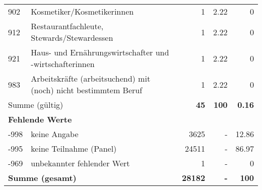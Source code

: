 \begin{longtable}{lXrrr}
        902 & \multicolumn{1}{X}{Kosmetiker/Kosmetikerinnen} & %
          \num{1} &
          \num[round-mode=places,round-precision=2]{2,22} &
          \num[round-mode=places,round-precision=2]{0} \\

        912 & \multicolumn{1}{X}{Restaurantfachleute, Stewards/Stewardessen} & %
          \num{1} &
          \num[round-mode=places,round-precision=2]{2,22} &
          \num[round-mode=places,round-precision=2]{0} \\

        921 & \multicolumn{1}{X}{Haus- und Ernährungswirtschafter und -wirtschafterinnen} & %
          \num{1} &
          \num[round-mode=places,round-precision=2]{2,22} &
          \num[round-mode=places,round-precision=2]{0} \\

        983 & \multicolumn{1}{X}{Arbeitskräfte (arbeitsuchend) mit (noch) nicht bestimmtem Beruf} & %
          \num{1} &
          \num[round-mode=places,round-precision=2]{2,22} &
          \num[round-mode=places,round-precision=2]{0} \\

     \midrule
     \multicolumn{2}{l}{Summe (gültig)} &
       \textbf{\num{45}} &
     \textbf{100} &
       \textbf{\num[round-mode=places,round-precision=2]{0,16}} \\
     \multicolumn{5}{l}{\textbf{Fehlende Werte}}\\
       -998 &
       keine Angabe &
         \num{3625} &
        - &
         \num[round-mode=places,round-precision=2]{12,86} \\
       -995 &
       keine Teilnahme (Panel) &
         \num{24511} &
        - &
         \num[round-mode=places,round-precision=2]{86,97} \\
       -969 &
       unbekannter fehlender Wert &
         \num{1} &
        - &
         \num[round-mode=places,round-precision=2]{0} \\
     \midrule
     \multicolumn{2}{l}{\textbf{Summe (gesamt)}} &
          \textbf{\num{28182}} &
        \textbf{-} &
        \textbf{100} \\
     \bottomrule
     \end{longtable}
     
